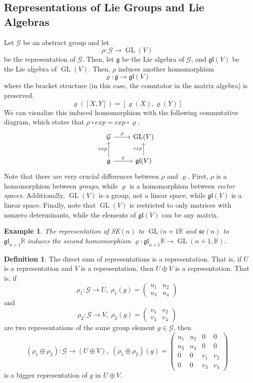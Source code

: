 \documentclass{article}
\DeclareMathOperator{\GL}{GL}
\newtheorem{example}{Example}[section]
\theoremstyle{remark}
\theoremstyle{definition}
\newtheorem{definition}{Definition}[section]
\begin{document}
\subsection{Representations of Lie Groups and Lie Algebras}
Let $\mathcal{G}$ be an abstract group and let
\[\rho: \mathcal{G} \longrightarrow \GL(V)\]
be the representation of $\mathcal{G}$. Then, let $\mathfrak{g}$ be the Lie algebra of $\mathcal{G}$, and $\mathfrak{gl}(V)$ be the Lie algebra of $\GL(V)$. Then, $\rho$ induces another homomorphism 
\[\varrho: \mathfrak{g} \longrightarrow \mathfrak{gl}(V)\]
where the bracket structure (in this case, the comutator in the matrix algebra) is preserved. 
\[\varrho([X,Y]) = [\varrho(X), \varrho(Y)]\]
We can visualize this induced homomorphism with the following commutative diagram, which states that $\rho \circ exp = exp \circ \varrho$. 
\[\begin{tikzcd}
\mathcal{G} \arrow{r}{\rho} & \GL(V)\\
\mathfrak{g} \arrow{u}{exp} \arrow{r}{\varrho} & \mathfrak{gl}(V) \arrow{u}{exp}
\end{tikzcd}\]
Note that there are very crucial differences between $\rho$ and $\varrho$. First, $\rho$ is a homomorphism between \textit{groups}, while $\varrho$ is a homomorphism between \textit{vector spaces}. Additionally, $\GL(V)$ is a group, not a linear space, while $\mathfrak{gl}(V)$ is a linear space. Finally, note that $\GL(V)$ is restricted to only matrices with nonzero determinants, while the elements of $\mathfrak{gl}(V)$ can be any matrix. 

\begin{example}
The representation of SE$(n)$ to $\GL(n+1 \mathbb{R}$ and $\mathfrak{se}(n)$ to $\mathfrak{gl}_{n+1} \mathbb{R}$ induces the second homomorphism $\varrho: \mathfrak{gl}_{n+1} \mathbb{R} \longrightarrow \GL(n+1, \mathbb{R})$. 
\end{example}

\begin{definition}
The direct sum of representations is a representation. That is, if $U$ is a representation and $V$ is a representation, then $U \oplus V$ is a representation. That is, if 
\[\rho_1: \mathcal{G} \longrightarrow U, \; \rho_1 (g) = \begin{pmatrix}
u_1&u_2\\u_3&u_4
\end{pmatrix}\]
and
\[\rho_2: \mathcal{G} \longrightarrow V, \; \rho_2 (g) = \begin{pmatrix}
v_1 & v_2 \\ v_3 & v_4
\end{pmatrix}\]
are two representations of the same group element $g \in \mathcal{G}$, then 
\[(\rho_1 \oplus \rho_2): \mathcal{G} \longrightarrow (U \oplus V), \;(\rho_1 \oplus \rho_2) (g) = \begin{pmatrix}
u_1 & u_2 & 0 & 0 \\
u_3 & u_4 & 0 & 0 \\
0 & 0 & v_1 & v_2 \\
0 & 0 & v_3 & v_4 
\end{pmatrix}\]
is a bigger representation of $g$ in $U \oplus V$. 
\end{definition}
\end{document}
